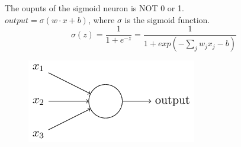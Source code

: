 \documentclass[10pt, compress]{beamer}
\begin{document}
\begin{frame}
  \vspace{0.7cm}
  \begin{multicols}{2}
    The ouputs of the sigmoid neuron is NOT 0 or 1. \\
    $output = \sigma(w \cdot x + b)$, where $\sigma$ is the sigmoid function. \\
    $$\sigma(z) = \frac{1}{1 + e^{-z}} = \frac{1}{1 + exp(-\sum_j w_jx_j - b)}$$
    \columnbreak
    \begin{figure}
      \includegraphics[width=.7\linewidth]{imgs/sigmoid_2}
    \end{figure}
  \end{multicols}

  \begin{figure}[ht]
  	\centering
  	\qquad
  \end{figure}

\end{frame}
\end{document}
